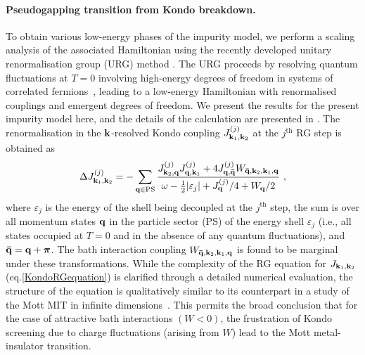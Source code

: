 \documentclass[%
 reprint,
superscriptaddress,
groupedaddress,
 amsmath,amssymb,
 aps,
prl
]{revtex4-2}
\begin{document}
\paragraph*{Pseudogapping transition from Kondo breakdown.} To obtain various low-energy phases of the impurity model, we perform a scaling analysis of the associated Hamiltonian using the recently developed 
unitary renormalisation group (URG) method \cite{anirbanurg1}. The URG
proceeds by resolving quantum fluctuations at $T=0$ involving high-energy degrees of freedom in systems of correlated fermions~\cite{santanukagome,1dhubjhep,anirbanmott2,anirbanmott1,siddharthacpi,anirban_kondo,Patra_2023,anirbanurg2}, leading to a low-energy Hamiltonian with renormalised couplings and emergent degrees of freedom. 
We present the results for the present impurity model here, and the details of the calculation are presented in \cite{suppmat}. 
The renormalisation in the %
${\bf k}$-resolved Kondo coupling \(J^{(j)}_{{\bf k}_1, {\bf k}_2}\) at the \(j^\text{th}\) RG step is obtained as
\begin{equation}\begin{aligned}\label{KondoRGequation}
	\Delta J^{(j)}_{{\bf k}_1, {\bf k}_2} = -\sum_{{\bf q} \in \text{PS}} \frac{J^{(j)}_{{\bf k}_2,{\bf q}} J^{(j)}_{{\bf q},{\bf k}_1} + 4J^{(j)}_{{\bf q}, {\bf \bar q}} W_{{\bf \bar q}, {\bf k}_2, {\bf k}_1, {\bf q}}}{\omega - \frac{1}{2}|\varepsilon_j| + J^{(j)}_{{\bf q}}/4 + W_{{\bf q}}/2}~,
\end{aligned}\end{equation}
where \(\varepsilon_j\) is the energy of the shell being decoupled at the \(j^\text{th}\) step, the sum is over all momentum states \({\bf q}\) in the particle sector (PS) of the energy shell \(\varepsilon_j\) (i.e., all states 
occupied at \(T=0\) and in the absence of any quantum fluctuations), and  \({\bf \bar q} = {\bf q} + {\boldsymbol \pi}\). The bath interaction coupling $W_{{\bf \bar q}, {\bf k}_2, {\bf k}_1, {\bf q}}$ is found to be marginal under these transformations. While the complexity of the RG equation for $J_{{\bf k}_1, {\bf k}_2}$ (eq.\eqref{KondoRGequation}) is clarified through a detailed numerical evaluation, the structure of the equation is qualitatively similar to its counterpart in a study of the Mott MIT in infinite dimensions~\cite{Mukherjee_2023}. This permits the broad conclusion that for the case of attractive bath interactions $(W<0)$, the frustration of Kondo screening due to charge fluctuations (arising from $W$) lead to the Mott metal-insulator transition.
\end{document}
